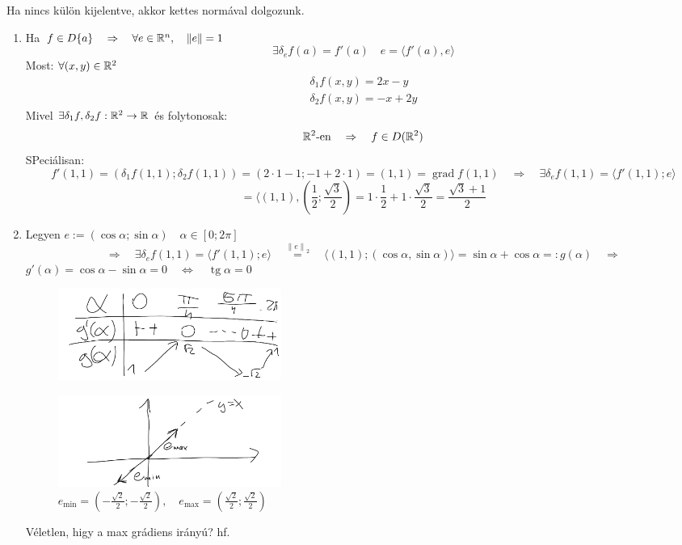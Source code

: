 \documentclass[a4paper,11.5pt]{article}
\DeclareMathOperator{\tg}{tg}
\DeclareMathOperator{\grad}{grad}
\newcommand{\norm}[1]{\left\lVert#1\right\rVert}
\begin{document}
	\begin{note}
		Ha nincs külön kijelentve, akkor kettes normával dolgozunk.
	\end{note}
	\begin{note}
		\begin{enumerate}
			\item Ha $f\in D\{a\}\quad \Rightarrow\quad \forall e\in\R^n,\quad \norm{e}=1$
			\[ \exists\delta_ef(a)=f'(a)\quad e=\langle f'(a),e\rangle \]
			Most: $\forall (x,y)\in\mathbb{R}^2$
			\begin{align*}
				\delta_1f(x,y)=2x-y\\
				\delta_2f(x,y)=-x+2y	
			\end{align*}
			Mivel $\exists\delta_1f, \delta_2f: \mathbb{R}^2\to\mathbb{R}$ és folytonosak:
			\[ \mathbb{R}^2\text{-en}\quad \Rightarrow\quad f\in D(\mathbb{R}^2) \]
			SPeciálisan:
			\[ f'(1,1)=(\delta_1f(1,1);\delta_2f(1,1))=(2\cdot1-1;-1+2\cdot1)=(1,1)=\grad f(1,1)\quad \Rightarrow\quad \exists\delta_ef(1,1)=\langle f'(1,1);e\rangle \]
			\[ =\langle(1,1),\left(\frac{1}{2};\frac{\sqrt{3}}{2}\right)=1\cdot\frac{1}{2}+1\cdot\frac{\sqrt{3}}{2}=\frac{\sqrt{3}+1}{2} \]
			\item Legyen $e:=(\cos\alpha; \sin\alpha)\quad \alpha\in[0;2\pi]$
			\[ \Rightarrow\quad \exists\delta_ef(1,1)=\langle f'(1,1);e\rangle\quad \overset{\norm{e}_2}{=}\quad \langle(1,1);(\cos\alpha,\sin\alpha)\rangle=\sin\alpha+\cos\alpha=:g(\alpha)\quad \Rightarrow \]
			$g'(\alpha)=\cos\alpha-\sin\alpha=0\quad \Leftrightarrow\quad \tg\alpha=0$
			\begin{figure}[H]
				\centering
				\includegraphics[height=3cm]{kepek/03.png}
				\caption{}
			\end{figure}
			\begin{figure}[H]
				\centering
				\includegraphics[height=3cm]{kepek/04.png}
				\caption{$e_{\min}= \left(-\frac{\sqrt{2}}{2};-\frac{\sqrt{2}}{2}\right),\quad e_{\max}= \left(\frac{\sqrt{2}}{2};\frac{\sqrt{2}}{2}\right)$}
			\end{figure}
			Véletlen, higy a max grádiens irányú? hf.
		\end{enumerate}
	\end{note}
\end{document}
